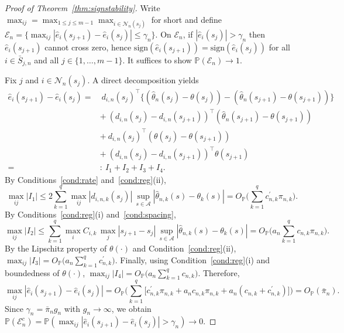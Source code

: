 \documentclass[lineno]{biometrika}
\begin{document}
\begin{proof}[Proof of Theorem~\ref{thm:signstability}]
Write $\max_{ij}=\max_{1\le j\le m-1}\max_{i\in\mathcal N_n(s_j)}$ for short and define
$\mathcal E_n=\{\max_{ij}|\hat e_i(s_{j+1})-\hat e_i(s_j)|\le \gamma_n\}$.
On $\mathcal E_n$, if $|\hat e_i(s_j)|>\gamma_n$ then $\hat e_i(s_{j+1})$ cannot cross zero, hence
$\mathrm{sign}(\hat e_i(s_{j+1}))=\mathrm{sign}(\hat e_i(s_j))$ for all $i\in\bar S_{j,n}$ and all
$j\in\{1,\ldots,m-1\}$. It suffices to show $\mathbb P(\mathcal E_n)\to 1$.

Fix $j$ and $i\in\mathcal N_n(s_j)$. A direct decomposition yields
\begin{align*}
\hat e_i(s_{j+1})-\hat e_i(s_j)
=&\ d_{i,n}(s_j)^\top\bigl\{(\hat\theta_n(s_j)-\theta(s_j))-(\hat\theta_n(s_{j+1})-\theta(s_{j+1}))\bigr\}\\
&+\ (d_{i,n}(s_j)-d_{i,n}(s_{j+1}))^\top(\hat\theta_n(s_{j+1})-\theta(s_{j+1}))\\
&+\ d_{i,n}(s_j)^\top(\theta(s_j)-\theta(s_{j+1}))\\
&+\ (d_{i,n}(s_j)-d_{i,n}(s_{j+1}))^\top\theta(s_{j+1})\\
=&:\ I_1+I_2+I_3+I_4.
\end{align*}
By Conditions~\ref{cond:rate} and~\ref{cond:reg}(ii),
\[
\max_{ij}|I_1|
\le 2\sum_{k=1}^q \max_{ij}|d_{i,n,k}(s_j)|\,\sup_{s\in\mathcal A}|\hat\theta_{n,k}(s)-\theta_k(s)|
=O_{\mathbb P}\Big(\sum_{k=1}^q c^{\prime}_{n,k}\pi_{n,k}\Big).
\]
By Conditions~\ref{cond:reg}(i) and~\ref{cond:spacing},
\[
\max_{ij}|I_2|
\le \sum_{k=1}^q \max_i C_{i,k}\,\max_j|s_{j+1}-s_j|\,\sup_{s\in\mathcal A}|\hat\theta_{n,k}(s)-\theta_k(s)|
=O_{\mathbb P}\Big(a_n\sum_{k=1}^q c_{n,k}\pi_{n,k}\Big).
\]
By the Lipschitz property of $\theta(\cdot)$ and Condition~\ref{cond:reg}(ii),
$\max_{ij}|I_3|=O_{\mathbb P}\big(a_n\sum_{k=1}^q c_{n,k}^\prime\big)$.
Finally, using Condition~\ref{cond:reg}(i) and boundedness of $\theta(\cdot)$,
$\max_{ij}|I_4|=O_{\mathbb P}\big(a_n\sum_{k=1}^q c_{n,k}\big)$.
Therefore,
\[
\max_{ij}|\hat e_i(s_{j+1})-\hat e_i(s_j)|
=O_{\mathbb P}\Big(\sum_{k=1}^q\big[c^{\prime}_{n,k}\pi_{n,k}+a_n c_{n,k}\pi_{n,k}+a_n(c_{n,k}+c_{n,k}^\prime)\big]\Big)
=O_{\mathbb P}(\bar\pi_n).
\]
Since $\gamma_n=\bar\pi_n g_n$ with $g_n\to\infty$, we obtain
$\mathbb P(\mathcal E_n^c)=\mathbb P(\max_{ij}|\hat e_i(s_{j+1})-\hat e_i(s_j)|>\gamma_n)\to 0$.
\end{proof}
\end{document}
